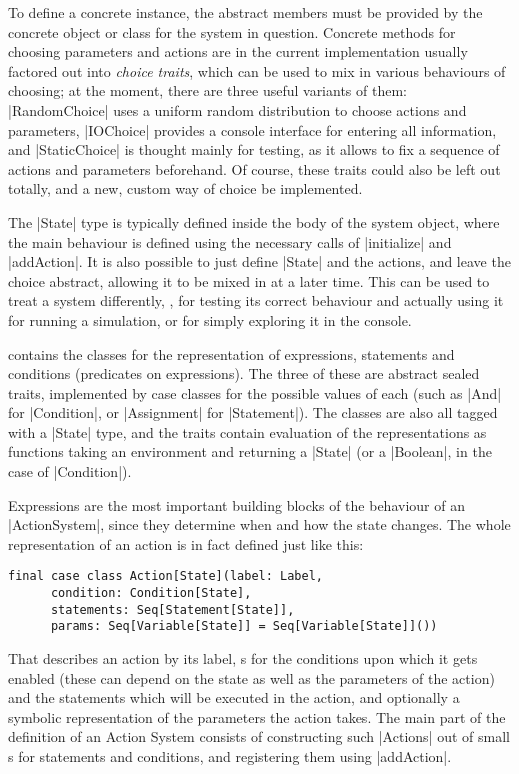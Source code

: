 To define a concrete instance, the abstract members must be provided by the concrete object or class
for the system in question. Concrete methods for choosing parameters and actions are in the current
implementation usually factored out into \emph{choice traits}, which can be used to mix in various
behaviours of choosing; at the moment, there are three useful variants of them: |RandomChoice| uses
a uniform random distribution to choose actions and parameters, |IOChoice| provides a console
interface for entering all information, and |StaticChoice| is thought mainly for testing, as it
allows to fix a sequence of actions and parameters beforehand. Of course, these traits could also be
left out totally, and a new, custom way of choice be implemented.

The |State| type is typically defined inside the body of the system object, where the main behaviour
is defined using the necessary calls of |initialize| and |addAction|. It is also possible to just
define |State| and the actions, and leave the choice abstract, allowing it to be mixed in at a later
time. This can be used to treat a system differently, \eg, for testing its correct behaviour and
actually using it for running a simulation, or for simply exploring it in the console.

\pagebreak[4]
 contains the
classes for the  representation of expressions, statements and conditions (predicates on
expressions). The three of these are abstract sealed traits, implemented by case classes for the
possible values of each (such as |And| for |Condition|, or |Assignment| for |Statement|). The
classes are also all tagged with a |State| type, and the traits contain evaluation of the
representations as functions taking an environment and returning a |State| (or a |Boolean|, in the
case of |Condition|).

Expressions are the most important building blocks of the behaviour of an |ActionSystem|, since they
determine when and how the state changes. The whole representation of an action is in fact defined
just like this:
\begin{lstlisting}[label=lst:action]
    final case class Action[State](label: Label,
      condition: Condition[State],
      statements: Seq[Statement[State]],
      params: Seq[Variable[State]] = Seq[Variable[State]]())
\end{lstlisting}
That describes an action by its label, s for the conditions upon which it gets enabled
(these can depend on the state as well as the parameters of the action) and the statements which
will be executed in the action, and optionally a symbolic representation of the parameters the
action takes. The main part of the definition of an Action System consists of constructing such
|Actions| out of small s for statements and conditions, and registering them using
|addAction|.

